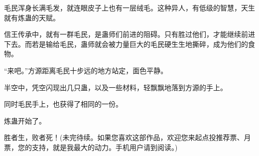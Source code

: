 \begin{this_body}
毛民浑身长满毛发，就连眼皮子上也有一层绒毛。这种异人，有低级的智慧，天生就有炼蛊的天赋。

信王传承中，就有一群毛民，是蛊师们前进的阻碍。只有胜过他们，才能继续前进下去。而若是输给毛民，蛊师就会被力量巨大的毛民硬生生地撕碎，成为他们的食物。

“来吧。”方源距离毛民十步远的地方站定，面色平静。

半空中，凭空闪现出几只蛊，以及一些材料，轻飘飘地落到方源的手上。

同时毛民手上，也获得了相同的一份。

炼蛊开始了。

胜者生，败者死！(未完待续。如果您喜欢这部作品，欢迎您来起点投推荐票、月票，您的支持，就是我最大的动力。手机用户请到阅读。)

\end{this_body}

